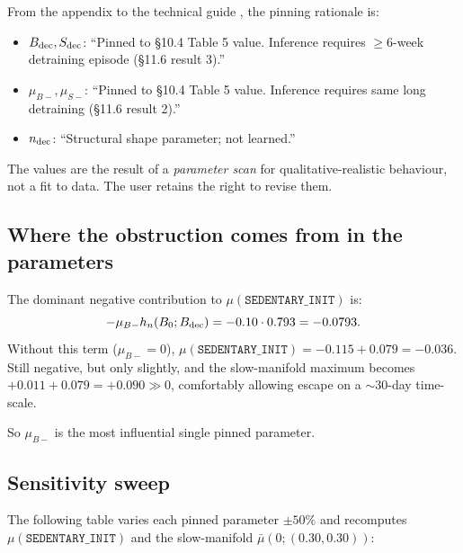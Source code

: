 \documentclass[11pt,a4paper]{article}
\theoremstyle{definition}
\begin{document}
From the appendix to the technical guide \cite[\S{}A]{tech-guide-v5}, the pinning rationale is:

\begin{itemize}
  \item $B_{\rm dec}, S_{\rm dec}$: ``Pinned to \S{}10.4 Table 5 value. Inference requires $\ge 6$-week detraining episode (\S{}11.6 result 3).''
  \item $\mu_{B-}, \mu_{S-}$: ``Pinned to \S{}10.4 Table 5 value. Inference requires same long detraining (\S{}11.6 result 2).''
  \item $n_{\rm dec}$: ``Structural shape parameter; not learned.''
\end{itemize}

The values are the result of a \emph{parameter scan} for qualitative-realistic behaviour, not a fit to data. The user retains the right to revise them.

\subsection{Where the obstruction comes from in the parameters}

The dominant negative contribution to $\mu(\texttt{SEDENTARY\_INIT})$ is:
\[
-\mu_{B-} h_n(B_0; B_{\rm dec}) = -0.10 \cdot 0.793 = -0.0793.
\]
Without this term ($\mu_{B-} = 0$), $\mu(\texttt{SEDENTARY\_INIT}) = -0.115 + 0.079 = -0.036$. Still negative, but only slightly, and the slow-manifold maximum becomes $+0.011 + 0.079 = +0.090 \gg 0$, comfortably allowing escape on a $\sim 30$-day time-scale.

So $\mu_{B-}$ is the most influential single pinned parameter.

\subsection{Sensitivity sweep}

The following table varies each pinned parameter $\pm 50\%$ and recomputes $\mu(\texttt{SEDENTARY\_INIT})$ and the slow-manifold $\bar\mu(0; (0.30, 0.30))$:
\end{document}
